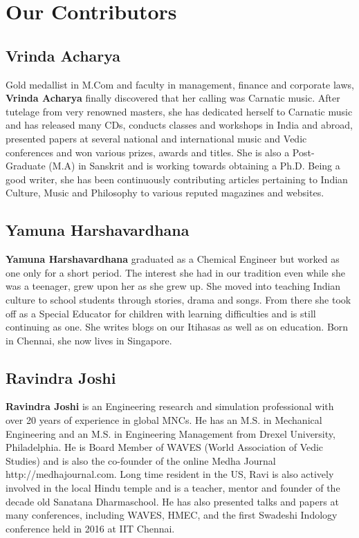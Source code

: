 
\chapter*{Our Contributors }\label{contributors}

\section*{Vrinda Acharya}

Gold medallist in M.Com and faculty in management, finance and corporate laws, \textbf{Vrinda Acharya} finally discovered that her calling was Carnatic music. After tutelage from very renowned masters, she has dedicated herself to Carnatic music and has released many CDs, conducts classes and workshops in India and abroad, presented papers at several national and international music and Vedic conferences and won various prizes, awards and titles. She is also a Post- Graduate (M.A) in Sanskrit and is working towards obtaining a Ph.D. Being a good writer, she has been continuously contributing articles pertaining to Indian Culture, Music and Philosophy to various reputed magazines and websites. 

\section*{Yamuna Harshavardhana}

\textbf{Yamuna Harshavardhana} graduated as a Chemical Engineer but worked as one only for a short period. The interest she had in our tradition even while she was a teenager, grew upon her as she grew up. She moved into teaching Indian culture to school students through stories, drama and songs. From there she took off as a Special Educator for children with learning difficulties and is still continuing as one. She writes blogs on our Itihasas as well as on education. Born in Chennai, she now lives in Singapore.

\newpage

\section*{Ravindra Joshi}

\textbf{Ravindra Joshi} is an Engineering research and simulation professional with over 20 years of experience in global MNCs. He has an M.S. in Mechanical Engineering and an M.S. in Engineering Management from Drexel University, Philadelphia. He is Board Member of WAVES (World Association of Vedic Studies) and is also the co-founder of the online Medha Journal http://medhajournal.com. Long time resident in the US, Ravi is also actively involved in the local Hindu temple and is a teacher, mentor and founder of the decade old Sanatana Dharma\break school. He has also presented talks and papers at many conferences, including WAVES, HMEC, and the first Swadeshi Indology conference held in 2016 at IIT Chennai.

